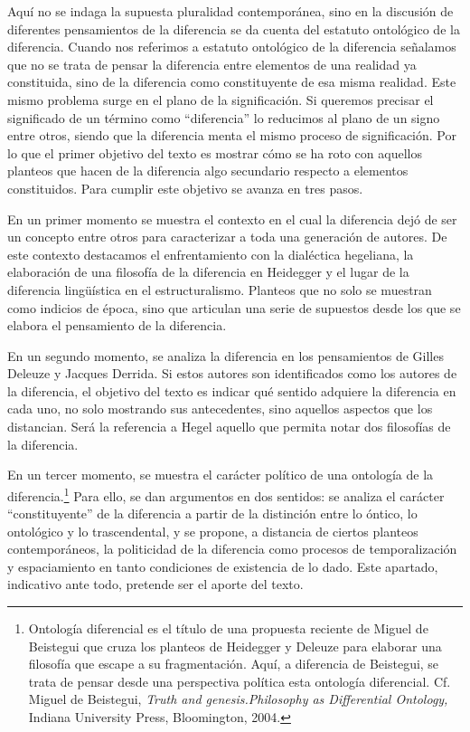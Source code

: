 Aquí no se indaga la supuesta pluralidad contemporánea, sino en la
discusión de diferentes pensamientos de la diferencia se da cuenta del
estatuto ontológico de la diferencia. Cuando nos referimos a estatuto
ontológico de la diferencia señalamos que no se trata de pensar la
diferencia entre elementos de una realidad ya constituida, sino de la
diferencia como constituyente de esa misma realidad. Este mismo problema
surge en el plano de la significación. Si queremos precisar el
significado de un término como \enquote{diferencia} lo reducimos al plano de un
signo entre otros, siendo que la diferencia menta el mismo proceso de
significación. Por lo que el primer objetivo del texto es mostrar cómo
se ha roto con aquellos planteos que hacen de la diferencia algo
secundario respecto a elementos constituidos. Para cumplir este objetivo
se avanza en tres pasos.

En un primer momento se muestra el contexto en el cual la diferencia
dejó de ser un concepto entre otros para caracterizar a toda una
generación de autores. De este contexto destacamos el enfrentamiento con
la dialéctica hegeliana, la elaboración de una filosofía de la
diferencia en Heidegger y el lugar de la diferencia lingüística en el
estructuralismo. Planteos que no solo se muestran como indicios de
época, sino que articulan una serie de supuestos desde los que se
elabora el pensamiento de la diferencia.

En un segundo momento, se analiza la diferencia en los pensamientos de
Gilles Deleuze y Jacques Derrida. Si estos autores son identificados
como los autores de la diferencia, el objetivo del texto es indicar qué
sentido adquiere la diferencia en cada uno, no solo mostrando sus
antecedentes, sino aquellos aspectos que los distancian. Será la
referencia a Hegel aquello que permita notar dos filosofías de la
diferencia.

En un tercer momento, se muestra el carácter político de una ontología
de la diferencia.\footnote{Ontología diferencial es el título de una
  propuesta reciente de Miguel de Beistegui que cruza los planteos de
  Heidegger y Deleuze para elaborar una filosofía que escape a su
  fragmentación. Aquí, a diferencia de Beistegui, se trata de pensar
  desde una perspectiva política esta ontología diferencial. Cf. Miguel
  de Beistegui, \emph{Truth and genesis.Philosophy as Differential
  Ontology,} Indiana University Press, Bloomington, 2004.} Para ello,
se dan argumentos en dos sentidos: se analiza el carácter
\enquote{constituyente} de la diferencia a partir de la distinción entre lo
óntico, lo ontológico y lo trascendental, y se propone, a distancia de
ciertos planteos contemporáneos, la politicidad de la diferencia como
procesos de temporalización y espaciamiento en tanto condiciones de
existencia de lo dado. Este apartado, indicativo ante todo, pretende ser
el aporte del texto.

